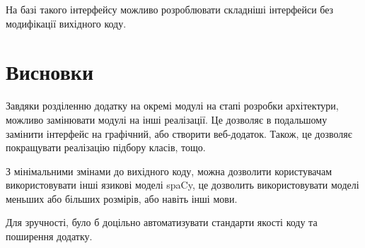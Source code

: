 \documentclass{article}
\let\oldsection\section
\renewcommand{\section}{\clearpage\oldsection}
\begin{document}
На базі такого інтерфейсу можливо розроблювати складніші інтерфейси
без модифікації вихідного коду.

\section{Висновки}
Завдяки розділенню додатку на окремі модулі на єтапі розробки архітектури,
можливо замінювати модулі на інші реалізації.
Це дозволяє в подальшому замінити інтерфейс на графічний, або створити веб-додаток.
Також, це дозволяє покращувати реалізацію підбору класів, тощо.

З мінімальними змінами до вихідного коду, можна дозволити користувачам
використовувати інші язикові моделі spaCy, це дозволить використовувати моделі
меньших або більших розмірів, або навіть інші мови.

Для зручності, було б доцільно автоматизувати стандарти якості
коду та поширення додатку.
\end{document}
